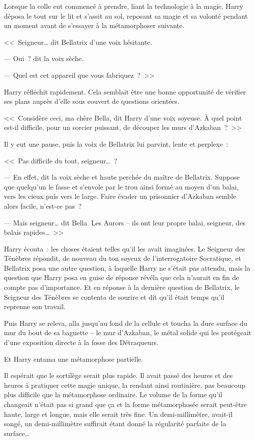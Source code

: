 Lorsque la colle eut commencé à prendre, liant la technologie à la magie, Harry déposa le tout sur le lit et s'assit au sol, reposant sa magie et sa volonté pendant un moment avant de s'essayer à la métamorphoser suivante.

<<~Seigneur… dit Bellatrix d'une voix hésitante.

--- Oui~? dit la voix sèche.

--- Quel est cet appareil que vous fabriquez~?~>>

Harry réfléchit rapidement. Cela semblait être une bonne opportunité de vérifier ses plans auprès d'elle sous couvert de questions orientées.

<<~Considère ceci, ma chère Bella, dit Harry d'une voix soyeuse. À quel point est-il difficile, pour un sorcier puissant, de découper les murs d'Azkaban~?~>>

Il y eut une pause, puis la voix de Bellatrix lui parvint, lente et perplexe~:

<<~Pas difficile du tout, seigneur…~?

--- En effet, dit la voix sèche et haute perchée du maître de Bellatrix. Suppose que quelqu'un le fasse et s'envole par le trou ainsi formé au moyen d'un balai, vers les cieux puis vers le large. Faire évader un prisonnier d'Azkaban semble alors facile, n'est-ce pas~?

--- Mais seigneur… dit Bella. Les Aurors -- ils ont leur propre balai, seigneur, des balais rapides…~>>

Harry écouta~: les choses étaient telles qu'il les avait imaginées. Le Seigneur des Ténèbres répondit, de nouveau du ton soyeux de l'interrogatoire Socratique, et Bellatrix posa une autre question, à laquelle Harry ne s'était pas attendu, mais la question que Harry posa en guise de réponse révéla que cela n'aurait en fin de compte pas d'importance. Et en réponse à la dernière question de Bellatrix, le Seigneur des Ténèbres se contenta de sourire et dit qu'il était temps qu'il reprenne son travail.

Puis Harry se releva, alla jusqu'au fond de la cellule et toucha la dure surface du mur du bout de sa baguette -- le mur d'Azkaban, le métal solide qui les protégeait d'une exposition directe à la fosse des Détraqueurs.

Et Harry entama une métamorphose partielle.

Il espérait que le sortilège serait plus rapide. Il avait passé des heures et des heures à pratiquer cette magie unique, la rendant ainsi routinière, pas beaucoup plus difficile que la métamorphose ordinaire. Le volume de la forme qu'il changeait n'était pas si grand que ça et la forme métamorphosée serait peut-être haute, large et longue, mais elle serait très fine. Un demi-millimètre, avait-il songé, un demi-millimètre suffirait étant donné la régularité parfaite de la surface…

